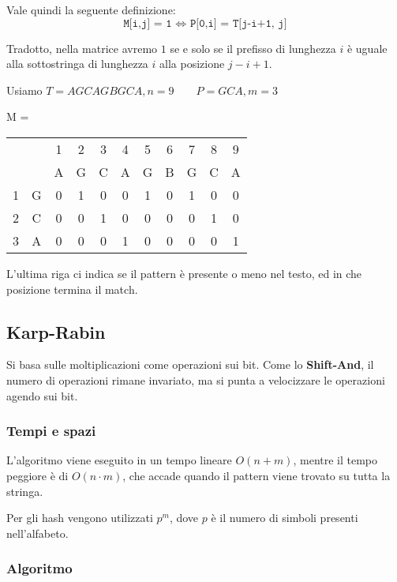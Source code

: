 \documentclass{article}
\begin{document}
Vale quindi la seguente definizione:
\begin{equation*}
    \texttt{M[i,j] = 1 $\Leftrightarrow$ P[0,i] = T[j-i+1, j]}
\end{equation*}

Tradotto, nella matrice avremo $1$ se e solo se il prefisso di lunghezza $i$ è uguale alla sottostringa di lunghezza $i$ alla posizione $j-i + 1$.

\begin{example}{}{}
    Usiamo $T = AGCAGBGCA, n = 9 \qquad P = GCA, m = 3$
    \begin{center}
    M = \begin{tabular}{l c | *{9}{c} }
        ~ & ~ & 1 & 2 & 3 & 4 & 5 & 6 & 7 & 8 & 9 \\
        ~ & ~ & A & G & C & A & G & B & G & C & A \\
        \hline
        1 & G & 0 & 1 & 0 & 0 & 1 & 0 & 1 & 0 & 0 \\
        2 & C & 0 & 0 & 1 & 0 & 0 & 0 & 0 & 1 & 0 \\
        3 & A & 0 & 0 & 0 & 1 & 0 & 0 & 0 & 0 & 1
    \end{tabular}
    \end{center}
\end{example}
L'ultima riga ci indica se il pattern è presente o meno nel testo, ed in che posizione termina il match.

\subsection{Karp-Rabin}

Si basa sulle moltiplicazioni come operazioni sui bit. Come lo \textbf{Shift-And}, il numero di operazioni rimane invariato, ma si punta a velocizzare le operazioni agendo sui bit.

\subsubsection{Tempi e spazi}

L'algoritmo viene eseguito in un tempo lineare $O(n + m)$, mentre il tempo peggiore è di $O(n \cdot m)$, che accade quando il pattern viene trovato su tutta la stringa.

Per gli hash vengono utilizzati $p^m$, dove $p$ è il numero di simboli presenti nell'alfabeto.

\subsubsection{Algoritmo}
\end{document}

